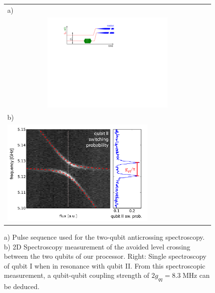 \begin{figure}[ht!]
	\centering
	\begin{tabular}{l}
	a) \\
		\multicolumn{1}{c}{\includegraphics[width=0.6\textwidth]{"./material/figures/measurement/anticrossing_spectroscopy"}} \\
	b) \\
		\includegraphics[width=0.7\textwidth]{"./data/ct5/2011_04_11 - anticrossing/qubit_anticrossing"} \\
	\end{tabular}
	\caption{a) Pulse sequence used for the two-qubit anticrossing spectroscopy. b) 2D Spectroscopy measurement of the avoided level crossing between the two qubits of our processor. Right: Single spectroscopy of qubit I when in resonance with qubit II. From this spectroscopic measurement, a qubit-qubit coupling strength of $2g_{qq}=8.3\;\mathrm{MHz}$ can be deduced. }
	\label{fig:qubit_anticrossing}
\end{figure}

